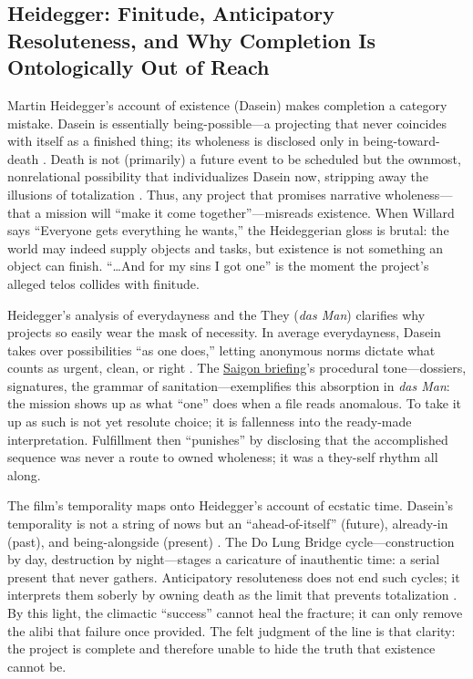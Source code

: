 \subsection*{Heidegger: Finitude, Anticipatory Resoluteness, and Why Completion Is
	Ontologically Out of Reach}
\label{ssec:iii-heidegger}
Martin Heidegger's account of existence (Dasein) makes completion a category mistake. Dasein is
essentially being-possible—a projecting that never coincides with itself as a finished thing;
its wholeness is disclosed only in being-toward-death \parencite[pp.~279--311]{HeideggerBT1962}.
Death is not (primarily) a future event to be scheduled but the ownmost, nonrelational
possibility that individualizes Dasein now, stripping away the illusions of totalization
\parencite[pp.~294--307]{HeideggerBT1962}. Thus, any project that promises narrative wholeness—that
a mission will ``make it come together''—misreads existence. When Willard says ``Everyone gets
everything he wants,'' the Heideggerian gloss is brutal: the world may indeed supply objects and
tasks, but existence is not something an object can finish. ``\ldots And for my sins I got one''
is the moment the project's alleged telos collides with finitude.

Heidegger's analysis of everydayness and the They (\emph{das Man}) clarifies why projects so
easily wear the mask of necessity. In average everydayness, Dasein takes over possibilities ``as
one does,'' letting anonymous norms dictate what counts as urgent, clean, or right
\parencite[pp.~149--168]{HeideggerBT1962}. The \hyperref[scene:briefing]{Saigon briefing}'s
procedural tone—dossiers, signatures, the grammar of sanitation—exemplifies this absorption in
\emph{das Man}: the mission
shows up as what ``one'' does when a file reads anomalous. To take it up as such is not yet
resolute choice; it is fallenness into the ready-made interpretation. Fulfillment then
``punishes'' by disclosing that the accomplished sequence was never a route to owned wholeness;
it was a they-self rhythm all along.

The film's temporality maps onto Heidegger's account of ecstatic time. Dasein's temporality is
not a string of nows but an ``ahead-of-itself'' (future), already-in (past), and being-alongside
(present) \parencite[pp.~373--383]{HeideggerBT1962}. The Do Lung Bridge cycle—construction by
day, destruction by night—stages a caricature of inauthentic time: a serial present that never
gathers. Anticipatory resoluteness does not end such cycles; it interprets them soberly by
owning death as the limit that prevents totalization \parencite[pp.~307--311]{HeideggerBT1962}.
By this light, the climactic ``success'' cannot heal the fracture; it can only remove the alibi
that failure once provided. The felt judgment of the line is that clarity: the project is
complete and therefore unable to hide the truth that existence cannot be.

